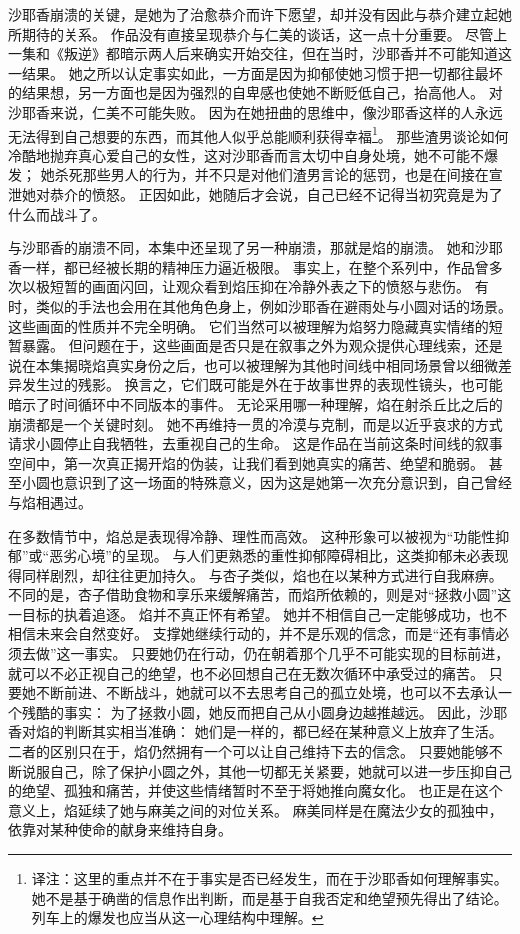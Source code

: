 沙耶香崩溃的关键，是她为了治愈恭介而许下愿望，却并没有因此与恭介建立起她所期待的关系。
作品没有直接呈现恭介与仁美的谈话，这一点十分重要。
尽管上一集和《叛逆》都暗示两人后来确实开始交往，但在当时，沙耶香并不可能知道这一结果。
她之所以认定事实如此，一方面是因为抑郁使她习惯于把一切都往最坏的结果想，另一方面也是因为强烈的自卑感也使她不断贬低自己，抬高他人。
对沙耶香来说，仁美不可能失败。
因为在她扭曲的思维中，像沙耶香这样的人永远无法得到自己想要的东西，而其他人似乎总能顺利获得幸福\footnote{%
    译注：这里的重点并不在于事实是否已经发生，而在于沙耶香如何理解事实。
    她不是基于确凿的信息作出判断，而是基于自我否定和绝望预先得出了结论。
    列车上的爆发也应当从这一心理结构中理解。
}。
那些渣男谈论如何冷酷地抛弃真心爱自己的女性，这对沙耶香而言太切中自身处境，她不可能不爆发；
她杀死那些男人的行为，并不只是对他们渣男言论的惩罚，也是在间接在宣泄她对恭介的愤怒。
正因如此，她随后才会说，自己已经不记得当初究竟是为了什么而战斗了。

与沙耶香的崩溃不同，本集中还呈现了另一种崩溃，那就是焰的崩溃。
她和沙耶香一样，都已经被长期的精神压力逼近极限。
事实上，在整个系列中，作品曾多次以极短暂的画面闪回，让观众看到焰压抑在冷静外表之下的愤怒与悲伤。
有时，类似的手法也会用在其他角色身上，例如沙耶香在避雨处与小圆对话的场景。
这些画面的性质并不完全明确。
它们当然可以被理解为焰努力隐藏真实情绪的短暂暴露。
但问题在于，这些画面是否只是在叙事之外为观众提供心理线索，还是说在本集揭晓焰真实身份之后，也可以被理解为其他时间线中相同场景曾以细微差异发生过的残影。
换言之，它们既可能是外在于故事世界的表现性镜头，也可能暗示了时间循环中不同版本的事件。
无论采用哪一种理解，焰在射杀丘比之后的崩溃都是一个关键时刻。
她不再维持一贯的冷漠与克制，而是以近乎哀求的方式请求小圆停止自我牺牲，去重视自己的生命。
这是作品在当前这条时间线的叙事空间中，第一次真正揭开焰的伪装，让我们看到她真实的痛苦、绝望和脆弱。
甚至小圆也意识到了这一场面的特殊意义，因为这是她第一次充分意识到，自己曾经与焰相遇过。

在多数情节中，焰总是表现得冷静、理性而高效。
这种形象可以被视为“功能性抑郁”或“恶劣心境”的呈现。
与人们更熟悉的重性抑郁障碍相比，这类抑郁未必表现得同样剧烈，却往往更加持久\cite{ref47}。
与杏子类似，焰也在以某种方式进行自我麻痹。
不同的是，杏子借助食物和享乐来缓解痛苦，而焰所依赖的，则是对“拯救小圆”这一目标的执着追逐。
焰并不真正怀有希望。
她并不相信自己一定能够成功，也不相信未来会自然变好。
支撑她继续行动的，并不是乐观的信念，而是“还有事情必须去做”这一事实。
只要她仍在行动，仍在朝着那个几乎不可能实现的目标前进，就可以不必正视自己的绝望，也不必回想自己在无数次循环中承受过的痛苦。
只要她不断前进、不断战斗，她就可以不去思考自己的孤立处境，也可以不去承认一个残酷的事实：
为了拯救小圆，她反而把自己从小圆身边越推越远。
因此，沙耶香对焰的判断其实相当准确：
她们是一样的，都已经在某种意义上放弃了生活。
二者的区别只在于，焰仍然拥有一个可以让自己维持下去的信念。
只要她能够不断说服自己，除了保护小圆之外，其他一切都无关紧要，她就可以进一步压抑自己的绝望、孤独和痛苦，并使这些情绪暂时不至于将她推向魔女化。
也正是在这个意义上，焰延续了她与麻美之间的对位关系。
麻美同样是在魔法少女的孤独中，依靠对某种使命的献身来维持自身。

